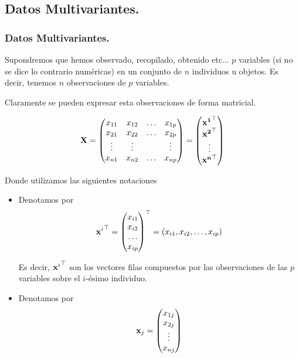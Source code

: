  \subsection{Datos Multivariantes.}
\begin{frame}
\frametitle{Datos Multivariantes.}

Supondremos  que hemos observado, recopilado, obtenido etc... $p$ variables  (si no se dice lo contrario numéricas) en un conjunto de $n$ individuos u objetos. Es decir, tenemos $n$ observaciones de $p$ variables.

Claramente se pueden expresar esta observaciones de forma matricial.

$$\mathbf{X}=\begin{pmatrix}
x_{1 1} & x_{1 2} &\ldots & x_{1 p}\\
x_{2 1} & x_{2 2} &\ldots & x_{2 p}\\
\vdots & \vdots   &       &\vdots\\ 
x_{n 1} & x_{n 2} &\ldots & x_{n p}
\end{pmatrix}=\begin{pmatrix}{\mathbf{x^1}}^\top\\ {\mathbf{x^2}}^\top\\\vdots \\ {\mathbf{x^n}}^\top\end{pmatrix}$$
  \end{frame}


\begin{frame}

Donde utilizamos las siguientes notaciones
 
\begin{itemize}
\item Denotamos por $${\mathbf{x}^i}^\top =\begin{pmatrix} x_{i 1} \\ x_{i 2}\\ \ldots \\ x_{i p} \end{pmatrix}^\top =(x_{i 1},x_{i 2},\ldots, x_{i p})$$

 Es decir, ${\mathbf{x}^i}^\top $ son los vectores filas compuestos por las observaciones de las $p$ variables sobre el $i$-ésimo individuo.
 
 \item Denotamos por
 $$\mathbf{x}_j=\begin{pmatrix}x_{1 j} \\ x_{2 j}\\ \vdots \\ x_{n j} \end{pmatrix}$$
\end{itemize}
\end{frame}
 
